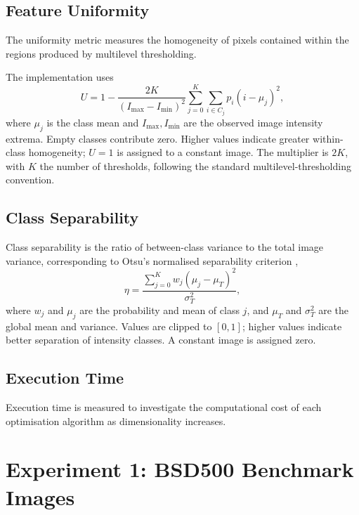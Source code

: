 \documentclass[review,authoryear]{elsarticle}
\begin{document}
\subsection{Feature Uniformity}

The uniformity metric measures the homogeneity of pixels contained
within the regions produced by multilevel thresholding.

The implementation uses
\begin{equation}
U=1-\frac{2K}{(I_{\max}-I_{\min})^2}
\sum_{j=0}^{K}\sum_{i\in C_j}p_i(i-\mu_j)^2,
\end{equation}
where $\mu_j$ is the class mean and $I_{\max},I_{\min}$ are the observed
image intensity extrema. Empty classes contribute zero. Higher values
indicate greater within-class homogeneity; $U=1$ is assigned to a constant
image. The multiplier is $2K$, with $K$ the number of thresholds, following
the standard multilevel-thresholding convention.



\subsection{Class Separability}

Class separability is the ratio of between-class variance to the total image
variance, corresponding to Otsu's normalised separability criterion
\citep{otsu1979threshold},
\begin{equation}
\eta =
\frac{\sum_{j=0}^{K} w_j(\mu_j-\mu_T)^2}{\sigma_T^2},
\end{equation}
where $w_j$ and $\mu_j$ are the probability and mean of class $j$, and
$\mu_T$ and $\sigma_T^2$ are the global mean and variance. Values are
clipped to $[0,1]$; higher values indicate better separation of intensity
classes. A constant image is assigned zero.


\subsection{Execution Time}

Execution time is measured to investigate the computational cost of
each optimisation algorithm as dimensionality increases.






\section{Experiment 1: BSD500 Benchmark Images}
\end{document}

